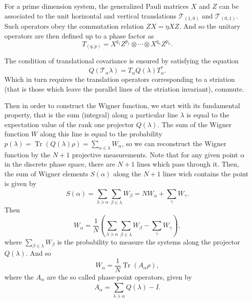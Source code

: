\documentclass[a4paper]{article}
\DeclareMathOperator{\Tr}{Tr}
\begin{document}
  For a prime dimension system, the generalized Pauli
  matrices $X$ and $Z$ can be associated to the unit
  horizontal and vertical translations $\mathcal T_{(1,0)}$ 
  and $\mathcal T_{(0,1)}$. Such operators obey the
  commutation relation $ZX = \eta XZ$. And so the unitary
  operators are then defined up to a phase factor as
  \[
    T_{(q,p)}
    = X^{q_1} Z^{p_1} \otimes \cdots \otimes X^{q_n}
    Z^{p_n}.
  \] 

  The condition of translational covariance is ensured by
  satisfying the equation
  \[
    Q(\mathcal T_\alpha \lambda)
    = T_\alpha Q(\lambda) T_\alpha^{*}.
  \] 
  Which in turn requires the translation operators
  corresponding to a striation (that is those which leave
  the parallel lines of the striation invariant), commute.

  Then in order to construct the Wigner function, we start
  with its fundamental property, that is the sum (integral)
  along a particular line $\lambda$ is equal to the
  expectation value of the rank one projector $Q(\lambda)$.
  The sum of the Wigner function $W$ along this line is
  equal to the probability $p(\lambda) = \Tr(Q(\lambda)
  \rho) = \sum_{\alpha \in \lambda}^{} W_\alpha$, so we can
  reconstruct the Wigner function by the $N+1$ projective
  measurements. Note that for any given point $\alpha$ in
  the discrete phase space, there are $N+1$ lines which pass
  through it. Then, the sum of Wigner elements $S(\alpha)$ 
  along the $N+1$ lines wich contains the point is given by
  \[
    S(\alpha)
    = \sum_{\lambda \ni \alpha}^{} \sum_{\beta \in
    \lambda}^{} W_\beta
    = NW_\alpha + \sum_{\gamma}^{} W_\gamma.
  \] 
  Then
  \[
    W_\alpha = \frac{1}{N} \left( \sum_{\lambda \ni
    \alpha}^{} \sum_{\beta \in \lambda}^{} W_\beta -
  \sum_{\gamma}^{} W_\gamma \right), 
  \] 
  where $\sum_{\beta \in \lambda}^{} W_\beta$ is the
  probability to measure the systems along the projector
  $Q(\lambda)$. And so
  \[
    W_\alpha
    = \frac{1}{N} \Tr(A_\alpha \rho),
  \] 
  where the $A_\alpha$ are the so called phase-point
  operators, given by
  \[
    A_\alpha = \sum_{\lambda \ni \alpha}^{} Q(\lambda) - I.
  \] 
\end{document}
